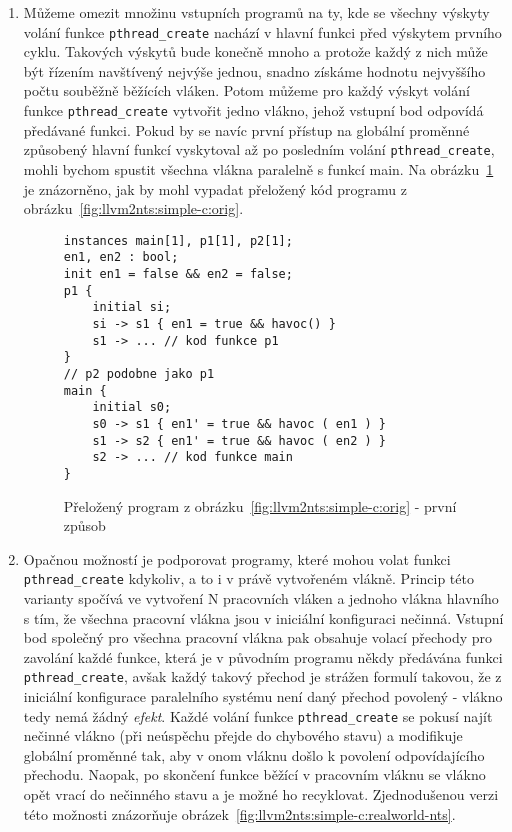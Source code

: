 \documentclass[10pt,a4paper,notitlepage]{report}
\begin{document}
\begin{enumerate}
\item Můžeme omezit množinu vstupních programů na ty, kde se všechny výskyty volání funkce \texttt{pthread\_create} nachází v hlavní funkci před výskytem prvního cyklu. Takových výskytů bude konečně mnoho a protože každý z nich může být řízením navštívený nejvýše jednou, snadno získáme hodnotu nejvyššího počtu souběžně běžících vláken. Potom můžeme pro každý výskyt volání funkce \texttt{pthread\_create} vytvořit jedno vlákno, jehož vstupní bod odpovídá předávané funkci. Pokud by se navíc první přístup na globální proměnné způsobený hlavní funkcí vyskytoval až po posledním volání \texttt{pthread\_create}, mohli bychom spustit všechna vlákna paralelně s funkcí main. Na obrázku~\ref{fig:llvm2nts:simple-c:simple-nts} je znázorněno, jak by mohl vypadat přeložený kód programu z obrázku~\ref{fig:llvm2nts:simple-c:orig}.


\begin{figure}[t]
\begin{lstlisting}
instances main[1], p1[1], p2[1];
en1, en2 : bool;
init en1 = false && en2 = false;
p1 {
	initial si;
	si -> s1 { en1 = true && havoc() }
	s1 -> ... // kod funkce p1
}
// p2 podobne jako p1
main {
	initial s0;
	s0 -> s1 { en1' = true && havoc ( en1 ) }
	s1 -> s2 { en1' = true && havoc ( en2 ) }
	s2 -> ... // kod funkce main
}
\end{lstlisting}
\caption{Přeložený program z obrázku~\ref{fig:llvm2nts:simple-c:orig} - první způsob}
\label{fig:llvm2nts:simple-c:simple-nts}
\end{figure}

\item Opačnou možností je podporovat programy, které mohou volat funkci \texttt{pthread\_create} kdykoliv, a to i v právě vytvořeném vlákně. Princip této varianty spočívá ve vytvoření N pracovních vláken a jednoho vlákna hlavního s tím, že všechna pracovní vlákna jsou v iniciální konfiguraci nečinná. Vstupní bod společný pro všechna pracovní vlákna pak obsahuje volací přechody pro zavolání každé funkce, která je v původním programu někdy předávána funkci \texttt{pthread\_create}, avšak každý takový přechod je strážen formulí takovou, že z iniciální konfigurace paralelního systému není daný přechod povolený - vlákno tedy nemá žádný \textit{efekt}. Každé volání funkce \texttt{pthread\_create} se pokusí najít nečinné vlákno (při neúspěchu přejde do chybového stavu) a modifikuje globální proměnné tak, aby v onom vláknu došlo k povolení odpovídajícího přechodu. Naopak, po skončení funkce běžící v pracovním vláknu se vlákno opět vrací do nečinného stavu a je možné ho recyklovat. Zjednodušenou verzi této možnosti znázorňuje obrázek~\ref{fig:llvm2nts:simple-c:realworld-nts}.
\end{enumerate}
\end{document}
